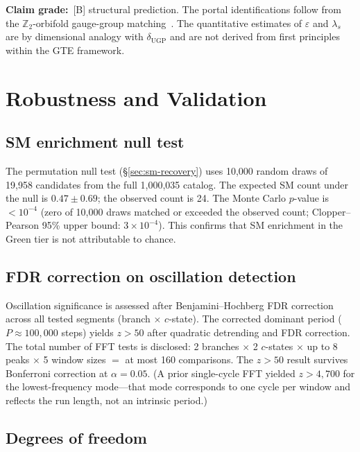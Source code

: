 \documentclass[12pt]{article}
\numberwithin{equation}{section}
\begin{document}
\noindent\textbf{Claim grade:}~[B] structural prediction.
The portal identifications follow from the $\mathbb{Z}_2$-orbifold
gauge-group matching~\cite{SpivackDeeperTheory}.
The quantitative estimates of $\varepsilon$ and $\lambda_s$ are by dimensional
analogy with $\delta_{\mathrm{UGP}}$ and are not derived from first principles
within the GTE framework.

\section{Robustness and Validation}
\label{sec:robustness}

\subsection{SM enrichment null test}

The permutation null test (\S\ref{sec:sm-recovery}) uses 10,000 random draws of 19,958 candidates from the full 1,000,035 catalog. The expected SM count under the null is $0.47 \pm 0.69$; the observed count is 24. The Monte Carlo $p$-value is $< 10^{-4}$ (zero of 10,000 draws matched or exceeded the observed count; Clopper--Pearson 95\% upper bound: $3 \times 10^{-4}$). This confirms that SM enrichment in the Green tier is not attributable to chance.

\subsection{FDR correction on oscillation detection}

Oscillation significance is assessed after Benjamini--Hochberg FDR correction across all tested segments (branch $\times$ $c$-state). The corrected dominant period ($P \approx 100{,}000$ steps) yields $z > 50$ after quadratic detrending and FDR correction. The total number of FFT tests is disclosed: 2 branches $\times$ 2 $c$-states $\times$ up to 8 peaks $\times$ 5 window sizes $= $ at most 160 comparisons. The $z > 50$ result survives Bonferroni correction at $\alpha = 0.05$. (A prior single-cycle FFT yielded $z > 4{,}700$ for the lowest-frequency mode---that mode corresponds to one cycle per window and reflects the run length, not an intrinsic period.)

\subsection{Degrees of freedom}
\end{document}
